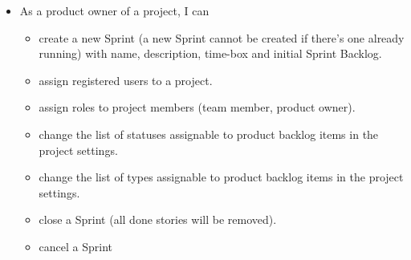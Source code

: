 \documentclass[
	accentcolor=tud1a %
]{tudreport}
\begin{document}
\begin{itemize}
	\item As a product owner of a project, I can
	\begin{itemize}
		\item create a new Sprint (a new Sprint cannot be created if there's one already running) with name, description, time-box and initial Sprint Backlog.
		\item assign registered users to a project.
		\item assign roles to project members (team member, product owner).
		\item change the list of statuses assignable to product backlog items in the project settings.
		\item change the list of types assignable to product backlog items in the project settings.
		\item close a Sprint (all done stories will be removed).
		\item cancel a Sprint
	\end{itemize}
\end{itemize}




\end{document}
